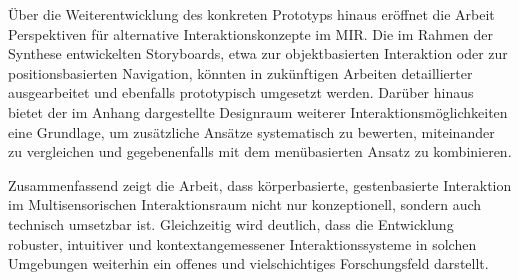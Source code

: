 Über die Weiterentwicklung des konkreten Prototyps hinaus eröffnet die Arbeit Perspektiven für alternative Interaktionskonzepte im MIR. Die im Rahmen der Synthese entwickelten Storyboards, etwa zur objektbasierten Interaktion oder zur positionsbasierten Navigation, könnten in zukünftigen Arbeiten detaillierter ausgearbeitet und ebenfalls prototypisch umgesetzt werden. Darüber hinaus bietet der im Anhang dargestellte Designraum weiterer Interaktionsmöglichkeiten eine Grundlage, um zusätzliche Ansätze systematisch zu bewerten, miteinander zu vergleichen und gegebenenfalls mit dem menübasierten Ansatz zu kombinieren.

Zusammenfassend zeigt die Arbeit, dass körper\-basierte, gestenbasierte Interaktion im Multisensorischen Interaktionsraum nicht nur konzeptionell, sondern auch technisch umsetzbar ist. Gleichzeitig wird deutlich, dass die Entwicklung robuster, intuitiver und kontextangemessener Interaktionssysteme in solchen Umgebungen weiterhin ein offenes und vielschichtiges Forschungsfeld darstellt.
